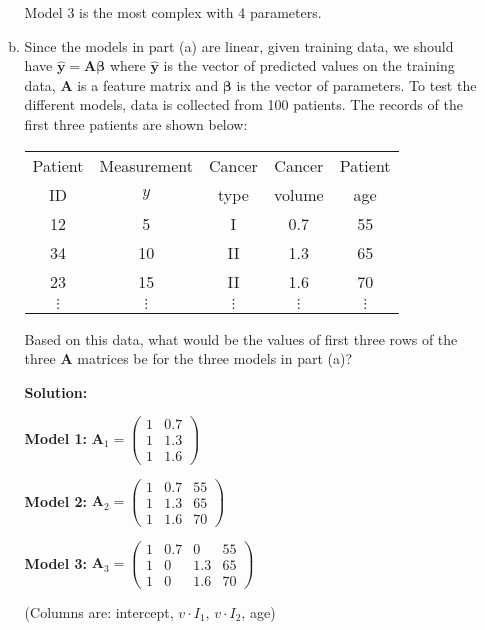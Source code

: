 \documentclass[11pt]{article}
\newcommand{\ybf}{\mathbf{y}}
\newcommand{\Abf}{\mathbf{A}}
\def\betabf{{\boldsymbol \beta}}
\begin{document}
\begin{enumerate}
\begin{enumerate}[(a)]
  Model 3 is the most complex with 4 parameters.

  \item Since the models in part (a) are linear, given training data,
  we should have $\hat{\ybf} = \Abf\betabf$
  where $\hat{\ybf}$ is the vector of predicted values on the training data,
  $\Abf$ is a feature matrix and $\betabf$ is the vector of parameters.
  To test the different models, data is collected from 100 patients.  The records of the first three patients are shown below:
\begin{center}
\begin{tabular}[h]{|c|c|c|c|c|} \hline
Patient & Measurement & Cancer & Cancer  & Patient \\
 ID &  $y$ &type & volume & age \\ \hline
12 & 5 &  I  & 0.7 & 55  \\ \hline
34 & 10 & II & 1.3 & 65  \\ \hline
23 & 15 & II & 1.6 & 70  \\ \hline
$\vdots$ & $\vdots$ & $\vdots$ & $\vdots$  & $\vdots$  \\ \hline
\end{tabular}
\end{center}
Based on this data, what would be the values of first three rows of the three
$\Abf$ matrices be for the three models in part (a)?

  \textbf{Solution:}
  
  \textbf{Model 1:} $\Abf_1 = \begin{pmatrix}
  1 & 0.7 \\
  1 & 1.3 \\
  1 & 1.6
  \end{pmatrix}$
  
  \textbf{Model 2:} $\Abf_2 = \begin{pmatrix}
  1 & 0.7 & 55 \\
  1 & 1.3 & 65 \\
  1 & 1.6 & 70
  \end{pmatrix}$
  
  \textbf{Model 3:} $\Abf_3 = \begin{pmatrix}
  1 & 0.7 & 0 & 55 \\
  1 & 0 & 1.3 & 65 \\
  1 & 0 & 1.6 & 70
  \end{pmatrix}$
  
  (Columns are: intercept, $v \cdot I_1$, $v \cdot I_2$, age)


\end{enumerate}
\end{enumerate}
\end{document}
